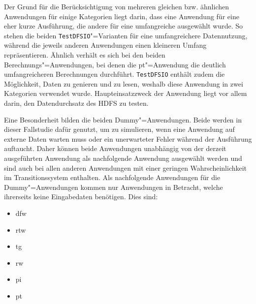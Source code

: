 Der Grund für die Berücksichtigung von mehreren gleichen bzw. ähnlichen Anwendungen für einige Kategorien liegt darin, dass eine Anwendung für eine eher kurze Ausführung, die andere für eine umfangreiche ausgewählt wurde.
So stehen die beiden \texttt{TestDFSIO}"=Varianten für eine umfangreichere Datennutzung, während die jeweils anderen Anwendungen einen kleineren Umfang repräsentieren.
Ähnlich verhält es sich bei den beiden Berechnungs"=Anwendungen, bei denen die \acl{pt}"=Anwendung die deutlich umfangreicheren Berechnungen durchführt.
\texttt{TestDFSIO} enthält zudem die Möglichkeit, Daten zu genieren und zu lesen, weshalb diese Anwendung in zwei Kategorien verwendet wurde.
Haupteinsatzzweck der Anwendung liegt vor allem darin, den Datendurchsatz des \ac{HDFS} zu testen.

Eine Besonderheit bilden die beiden Dummy"=Anwendungen.
Beide werden in dieser Fallstudie dafür genutzt, um zu simulieren, wenn eine Anwendung \zB auf externe Daten warten muss oder ein unerwarteter Fehler während der Ausführung auftaucht.
Daher können beide Anwendungen unabhängig von der derzeit ausgeführten Anwendung als nachfolgende Anwendung ausgewählt werden und sind auch bei allen anderen Anwendungen mit einer geringen Wahrscheinlichkeit im Transitionssystem enthalten.
Als nachfolgende Anwendungen für die Dummy"=Anwendungen kommen nur Anwendungen in Betracht, welche ihrerseits keine Eingabedaten benötigen. Dies sind:

\begin{itemize}
    \item \acl{dfw}
    \item \acl{rtw}
    \item \acl{tg}
    \item \acl{rw}
    \item \acl{pi}
    \item \acl{pt}
\end{itemize}

